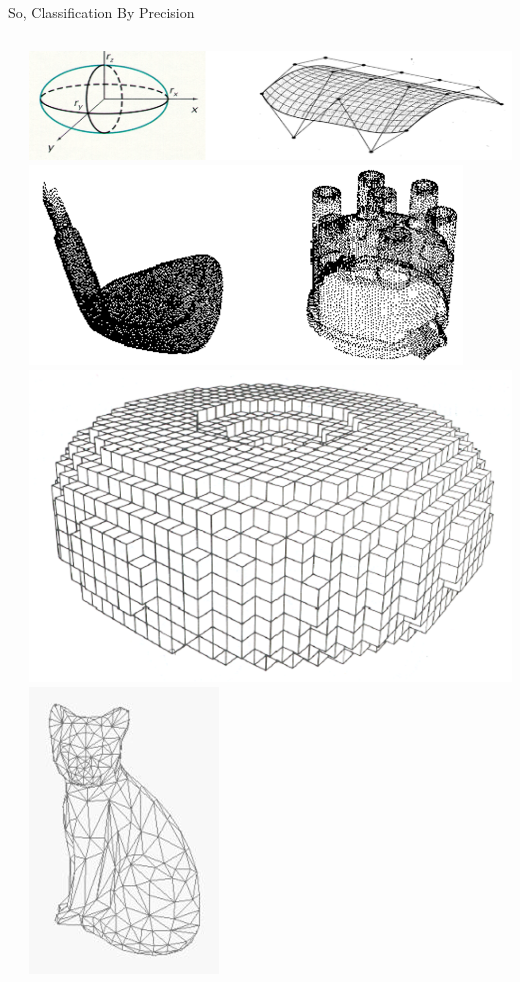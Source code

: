 \begin{frame}[fragile]{So, Classification By Precision}
\begin{columns}
\begin{column}{0.55\linewidth}
\begin{itemize}
\begin{itemize}
	\end{itemize}
\end{itemize}
  \end{column}%
  \begin{column}{0.45\linewidth}
			\begin{center}
\includegraphics[width=0.5\linewidth,keepaspectratio]{images/CADExact.png}
\includegraphics[width=0.6\linewidth,keepaspectratio]{images/CADCloud.png}
\includegraphics[width=0.6\linewidth,keepaspectratio]{images/CADVoxel.png}
	\includegraphics[width=0.6\linewidth,keepaspectratio]{images/CADMesh.png}

			\end{center}
  \end{column}
 \end{columns}
\end{frame}



